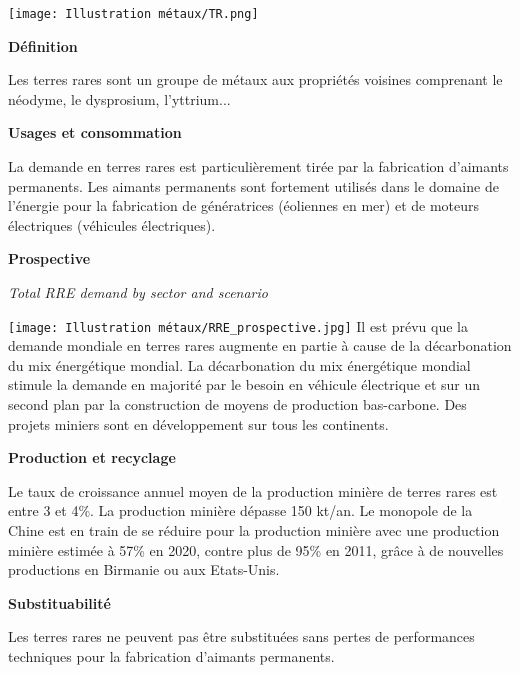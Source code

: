 \begin{center}
    \texttt{[image: Illustration métaux/TR.png]}
\end{center}
\begin{center}
    \textbf{Définition}
\end{center}
Les terres rares sont un groupe de métaux aux propriétés voisines comprenant le néodyme, le dysprosium, l'yttrium...\\

\begin{center}
    \textbf{Usages et consommation}
\end{center}
La demande en terres rares est particulièrement tirée par la fabrication
d'aimants permanents. Les aimants permanents sont fortement utilisés dans
le domaine de l'énergie pour la fabrication de génératrices (éoliennes en mer)
et de moteurs électriques (véhicules électriques).
\begin{center}
    \textbf{Prospective}
\end{center}
\begin{multicols}{2}
    \begin{center}
        \textit{Total RRE demand by sector and scenario}
    \end{center}
    \texttt{[image: Illustration métaux/RRE\_prospective.jpg]}
    \vfill\null
    \columnbreak
Il est prévu que la demande mondiale en terres rares augmente en partie à cause
de la décarbonation du mix énergétique mondial. La décarbonation du mix
énergétique mondial stimule la demande en majorité par le besoin en véhicule électrique
et sur un second plan par la construction de moyens de production bas-carbone.
Des projets miniers sont en développement sur tous les continents.
\end{multicols}
\begin{center}
    \textbf{Production et recyclage}
\end{center}
Le taux de croissance annuel moyen de la production minière de terres rares est entre 3 et 4\%. La production minière dépasse 150 kt/an. Le monopole de la Chine est en train de se réduire pour la production minière avec une production minière estimée à 57\% en 2020, contre plus de 95\% en 2011, grâce à de nouvelles productions en Birmanie ou aux Etats-Unis.
\begin{center}
    \textbf{Substituabilité}
\end{center}
Les terres rares ne peuvent pas être substituées sans pertes de performances
techniques pour la fabrication d'aimants permanents. 

